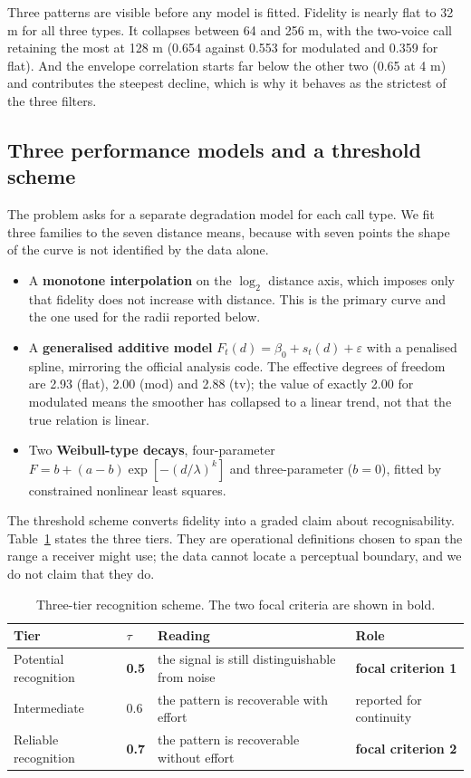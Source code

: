 Three patterns are visible before any model is fitted. Fidelity is nearly flat to 32 m for all
three types. It collapses between 64 and 256 m, with the two-voice call retaining the most at
128 m (0.654 against 0.553 for modulated and 0.359 for flat). And the envelope correlation starts
far below the other two (0.65 at 4 m) and contributes the steepest decline, which is why it
behaves as the strictest of the three filters.

\subsection{Three performance models and a threshold scheme}

The problem asks for a separate degradation model for each call type. We fit three families to
the seven distance means, because with seven points the shape of the curve is not identified by
the data alone.

\begin{itemize}[leftmargin=1.5em,itemsep=2pt]
  \item A \textbf{monotone interpolation} on the $\log_2$ distance axis, which imposes only that
        fidelity does not increase with distance. This is the primary curve and the one used for
        the radii reported below.
  \item A \textbf{generalised additive model} $F_t(d)=\beta_0+s_t(d)+\varepsilon$ with a penalised
        spline, mirroring the official analysis code. The effective degrees of freedom are 2.93
        (flat), 2.00 (mod) and 2.88 (tv); the value of exactly 2.00 for modulated means the
        smoother has collapsed to a linear trend, not that the true relation is linear.
  \item Two \textbf{Weibull-type decays}, four-parameter
        $F=b+(a-b)\exp[-(d/\lambda)^k]$ and three-parameter ($b=0$), fitted by constrained
        nonlinear least squares.
\end{itemize}

The threshold scheme converts fidelity into a graded claim about recognisability.
Table~\ref{tab:q2-thresholds} states the three tiers. They are operational definitions chosen to
span the range a receiver might use; the data cannot locate a perceptual boundary, and we do not
claim that they do.

\begin{table}[htbp]
  \centering
  \caption{Three-tier recognition scheme. The two focal criteria are shown in bold.}\label{tab:q2-thresholds}
  \small
  \begin{tabular}{llll}
    \toprule
    Tier & $\tau$ & Reading & Role \\
    \midrule
    Potential recognition & \textbf{0.5} & the signal is still distinguishable from noise & \textbf{focal criterion 1} \\
    Intermediate & 0.6 & the pattern is recoverable with effort & reported for continuity \\
    Reliable recognition & \textbf{0.7} & the pattern is recoverable without effort & \textbf{focal criterion 2} \\
    \bottomrule
  \end{tabular}
\end{table}

